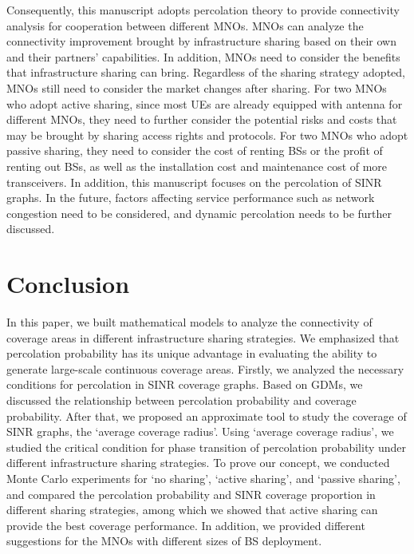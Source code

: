 \documentclass[final]{IEEEtran}
\begin{document}
\indent Consequently, this manuscript adopts percolation theory to provide connectivity analysis for cooperation between different MNOs. MNOs can analyze the connectivity improvement brought by infrastructure sharing based on their own and their partners' capabilities. In addition, MNOs need to consider the benefits that infrastructure sharing can bring. Regardless of the sharing strategy adopted, MNOs still need to consider the market changes after sharing. For two MNOs who adopt active sharing, since most UEs are already equipped with antenna for different MNOs, they need to further consider the potential risks and costs that may be brought by sharing access rights and protocols. For two MNOs who adopt passive sharing, they need to consider the cost of renting BSs or the profit of renting out BSs, as well as the installation cost and maintenance cost of more transceivers. In addition, this manuscript focuses on the percolation of SINR graphs. In the future, factors affecting service performance such as network congestion need to be considered, and dynamic percolation needs to be further discussed.

\section{Conclusion}
In this paper, we built mathematical models to analyze the connectivity of coverage areas in different infrastructure sharing strategies. We emphasized that percolation probability has its unique advantage in evaluating the ability to generate large-scale continuous coverage areas. Firstly, we analyzed the necessary conditions for percolation in SINR coverage graphs. Based on GDMs, we discussed the relationship between percolation probability and coverage probability. After that, we proposed an approximate tool to study the coverage of SINR graphs, \ie the `average coverage radius'. Using `average coverage radius', we studied the critical condition for phase transition of percolation probability under different infrastructure sharing strategies. To prove our concept, we conducted Monte Carlo experiments for `no sharing', `active sharing', and `passive sharing', and compared the percolation probability and SINR coverage proportion in different sharing strategies, among which we showed that active sharing can provide the best coverage performance.  In addition, we provided different suggestions for the MNOs with different sizes of BS deployment.



\appendices
\end{document}
